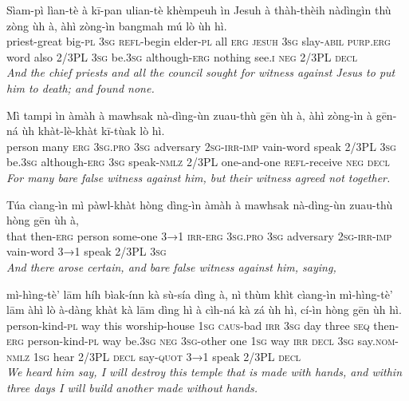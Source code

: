 \documentclass[11pt,a4paper]{article}
\begin{document}
\begin{exe}
\gll Sìam-pì lìan-tè à kī-pan ulian-tè khèmpeuh ìn Jesuh à thàh-thèih nàdìngìn thù zòng ùh à, àhì zòng-ìn bangmah mú lò ùh hì. \\
     priest-great big-\textsc{pl} \textsc{3sg} \textsc{refl}-begin elder-\textsc{pl} all \textsc{erg} \textsc{jesuh} \textsc{3sg} slay-\textsc{abil} \textsc{purp}.\textsc{erg} word also 2/3PL \textsc{3sg} be.\textsc{3sg} although-\textsc{erg} nothing see.\textsc{i} \textsc{neg} 2/3PL \textsc{decl} \\
\glt \textcolor{kjvcolor}{\textit{And the chief priests and all the council sought for witness against Jesus to put him to death; and found none.}}

\gll Mì tampi ìn àmàh à mawhsak nà-dìng-ùn zuau-thù gēn ùh à, àhì zòng-ìn à gēn-ná ùh khàt-lè-khàt kī-tùak lò hì. \\
     person many \textsc{erg} \textsc{3sg}.\textsc{pro} \textsc{3sg} adversary \textsc{2sg}-\textsc{irr}-\textsc{imp} vain-word speak 2/3PL \textsc{3sg} be.\textsc{3sg} although-\textsc{erg} \textsc{3sg} speak-\textsc{nmlz} 2/3PL one-and-one \textsc{refl}-receive \textsc{neg} \textsc{decl} \\
\glt \textcolor{kjvcolor}{\textit{For many bare false witness against him, but their witness agreed not together.}}

\gll Túa cìang-ìn mì pàwl-khàt hòng dìng-ìn àmàh à mawhsak nà-dìng-ùn zuau-thù hòng gēn ùh à, \\
     that then-\textsc{erg} person some-one \textsc{3→1} \textsc{irr}-\textsc{erg} \textsc{3sg}.\textsc{pro} \textsc{3sg} adversary \textsc{2sg}-\textsc{irr}-\textsc{imp} vain-word \textsc{3→1} speak 2/3PL \textsc{3sg} \\
\glt \textcolor{kjvcolor}{\textit{And there arose certain, and bare false witness against him, saying,}}

\gll mì-hìng-tè' lām híh bìak-ínn kà sù-sía dìng à, nì thùm khìt cìang-ìn mì-hìng-tè' lām àhì lò à-dàng khàt kà lām dìng hì à cìh-ná kà zá ùh hì, cí-ìn hòng gēn ùh hì. \\
     person-kind-\textsc{pl} way this worship-house \textsc{1sg} \textsc{caus}-bad \textsc{irr} \textsc{3sg} day three \textsc{seq} then-\textsc{erg} person-kind-\textsc{pl} way be.\textsc{3sg} \textsc{neg} \textsc{3sg}-other one \textsc{1sg} way \textsc{irr} \textsc{decl} \textsc{3sg} say.\textsc{nom}-\textsc{nmlz} \textsc{1sg} hear 2/3PL \textsc{decl} say-\textsc{quot} \textsc{3→1} speak 2/3PL \textsc{decl} \\
\glt \textcolor{kjvcolor}{\textit{We heard him say, I will destroy this temple that is made with hands, and within three days I will build another made without hands.}}


\end{exe}
\end{document}
